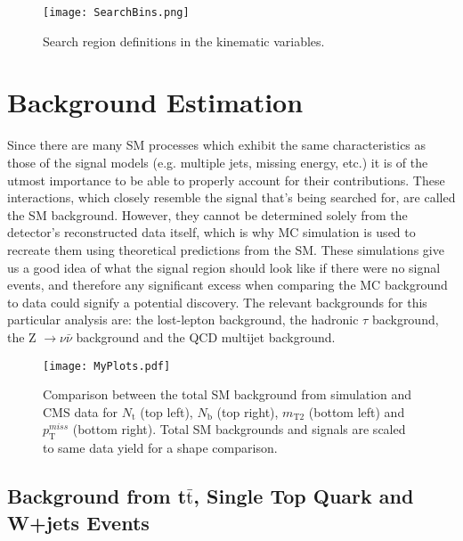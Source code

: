\begin{figure}[tb]
\begin{center}
\texttt{[image: SearchBins.png]} 
\caption{Search region definitions in the kinematic variables.}
\label{SearchBins.png} 
\end{center}
\end{figure}

\section{Background Estimation}\label{backgrounds}

Since there are many SM processes which exhibit the same characteristics as those of the signal models (e.g. multiple jets, missing energy, etc.) it is of the utmost importance to be able to properly account for their contributions. These interactions, which closely resemble the signal that's being searched for, are called the SM background. However, they cannot be determined solely from the detector's reconstructed data itself, which is why MC simulation is used to recreate them using theoretical predictions from the SM. These simulations give us a good idea of what the signal region should look like if there were no signal events, and therefore any significant excess when comparing the MC background to data could signify a potential discovery. The relevant backgrounds for this particular analysis are: the lost-lepton background, the hadronic $\tau$ background, the Z $\rightarrow\nu \bar{\nu}$ background and the QCD multijet background.

\begin{figure}[tb]
\begin{center}
\texttt{[image: MyPlots.pdf]} 
\caption{Comparison between the total SM background from simulation and CMS data for $N_\text{t}$ (top left), $N_\text{b}$ (top right),  $m_\text{T2}$ (bottom left) and $p_{\text{T}}^{miss}$ (bottom right). Total SM backgrounds and signals are scaled to same data yield for a shape comparison.}
\label{MyPlots.pdf} 
\end{center}
\end{figure}

\subsection{Background from t$\bar{\text{t}}$, Single Top Quark and W+jets Events}

